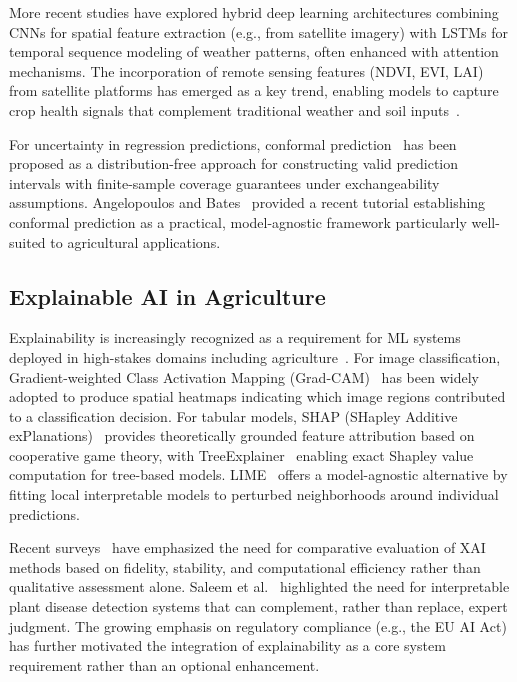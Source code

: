 \documentclass[conference]{IEEEtran}
\begin{document}
More recent studies have explored hybrid deep learning architectures combining CNNs for spatial feature extraction (e.g., from satellite imagery) with LSTMs for temporal sequence modeling of weather patterns, often enhanced with attention mechanisms. The incorporation of remote sensing features (NDVI, EVI, LAI) from satellite platforms has emerged as a key trend, enabling models to capture crop health signals that complement traditional weather and soil inputs~\cite{weiss2020remote}.

For uncertainty in regression predictions, conformal prediction~\cite{vovk2005algorithmic,shafer2008tutorial} has been proposed as a distribution-free approach for constructing valid prediction intervals with finite-sample coverage guarantees under exchangeability assumptions. Angelopoulos and Bates~\cite{angelopoulos2023conformal} provided a recent tutorial establishing conformal prediction as a practical, model-agnostic framework particularly well-suited to agricultural applications.

\subsection{Explainable AI in Agriculture}

Explainability is increasingly recognized as a requirement for ML systems deployed in high-stakes domains including agriculture~\cite{arrieta2020explainable}. For image classification, Gradient-weighted Class Activation Mapping (Grad-CAM)~\cite{selvaraju2017grad} has been widely adopted to produce spatial heatmaps indicating which image regions contributed to a classification decision. For tabular models, SHAP (SHapley Additive exPlanations)~\cite{lundberg2017unified} provides theoretically grounded feature attribution based on cooperative game theory, with TreeExplainer~\cite{lundberg2020local2global} enabling exact Shapley value computation for tree-based models. LIME~\cite{ribeiro2016should} offers a model-agnostic alternative by fitting local interpretable models to perturbed neighborhoods around individual predictions.

Recent surveys~\cite{linardatos2021explainable,samek2021explaining} have emphasized the need for comparative evaluation of XAI methods based on fidelity, stability, and computational efficiency rather than qualitative assessment alone. Saleem et al.~\cite{saleem2019plant} highlighted the need for interpretable plant disease detection systems that can complement, rather than replace, expert judgment. The growing emphasis on regulatory compliance (e.g., the EU AI Act) has further motivated the integration of explainability as a core system requirement rather than an optional enhancement.
\end{document}
